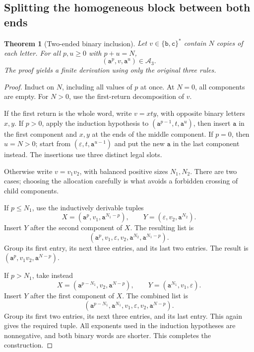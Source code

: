 \documentclass[11pt,letterpaper]{article}
\numberwithin{equation}{section}
\newtheorem{theorem}{Theorem}[section]
\theoremstyle{definition}
\theoremstyle{remark}
\newcommand{\A}{\mathcal A}
\newcommand{\eps}{\varepsilon}
\renewcommand{\aa}{\mathtt a}
\newcommand{\bb}{\mathtt b}
\newcommand{\cc}{\mathtt c}
\begin{document}
\subsection{Splitting the homogeneous block between both ends}
\begin{theorem}[Two-ended binary inclusion]
\label{thm:binary}
Let \(v\in\{\bb,\cc\}^{*}\) contain \(N\) copies of each letter. For
all \(p,u\geq0\) with \(p+u=N\),
\begin{equation}\label{eq:binary}
  (\aa^p,v,\aa^u)\in\A_3.
\end{equation}
The proof yields a finite derivation using only the original three rules.
\end{theorem}
\begin{proof}
Induct on \(N\), including all values of \(p\) at once. At \(N=0\), all
components are empty. For \(N>0\), use the first-return decomposition
of \(v\).

If the first return is the whole word, write \(v=xt y\), with opposite
binary letters \(x,y\). If \(p>0\), apply the induction hypothesis to
\((\aa^{p-1},t,\aa^u)\), then insert \(\aa\) in the first component and
\(x,y\) at the ends of the middle component. If \(p=0\), then \(u=N>0\);
start from \((\eps,t,\aa^{u-1})\) and put the new \(\aa\) in the last
component instead. The insertions use three distinct legal slots.

Otherwise write \(v=v_1v_2\), with balanced positive sizes
\(N_1,N_2\). There are two cases; choosing the allocation carefully is
what avoids a forbidden crossing of child components.

If \(p\leq N_1\), use the inductively derivable tuples
\[
 X=(\aa^p,v_1,\aa^{N_1-p}),\qquad
 Y=(\eps,v_2,\aa^{N_2}).
\]
Insert \(Y\) after the second component of \(X\). The resulting list is
\[
 (\aa^p,v_1,\eps,v_2,\aa^{N_2},\aa^{N_1-p}).
\]
Group its first entry, its next three entries, and its last two entries.
The result is \((\aa^p,v_1v_2,\aa^{N-p})\).

If \(p>N_1\), take instead
\[
 X=(\aa^{p-N_1},v_2,\aa^{N-p}),\qquad
 Y=(\aa^{N_1},v_1,\eps).
\]
Insert \(Y\) after the first component of \(X\). The combined list is
\[
 (\aa^{p-N_1},\aa^{N_1},v_1,\eps,v_2,\aa^{N-p}).
\]
Group its first two entries, its next three entries, and its last entry.
This again gives the required tuple. All exponents used in the
induction hypotheses are nonnegative, and both binary words are
shorter. This completes the construction.
\end{proof}
\end{document}
